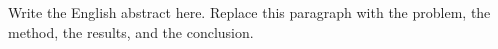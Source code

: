 
%

\begin{abstract}

在這裡寫中文摘要。刪掉這段文字，換成論述重點、方法或程序、結果與討論及結論。

\zhlipsum[1][name=trad]

\end{abstract}

\begin{abstract*}

Write the English abstract here. Replace this paragraph with the problem, the
method, the results, and the conclusion.

\lipsum[1]

\end{abstract*}
